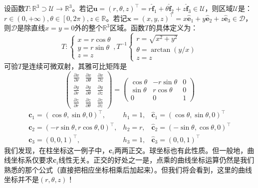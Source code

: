 \documentclass[../main.tex]{subfiles}
\begin{document}
\begin{example}[柱坐标]
    设函数$T:\mathbb{R}^3\supset\mathcal{U}\rightarrow\mathbb{R}^3$。若记$\mathbf{u}=\left(r,\theta,z\right)^\intercal=r\mathbf{\hat{f}}_1+\theta\mathbf{\hat{f}}_2+z\mathbf{\hat{f}}_3\in\mathcal{U}$，则区域$\mathcal{U}$是：$r\in\left(0,+\infty\right),\theta\in\left[0,2\pi\right),z\in\mathbb{R}$。若记$\mathbf{x}=\left(x,y,z\right)^\intercal=x\mathbf{\hat{e}}_1+y\mathbf{\hat{e}}_2+z\mathbf{\hat{e}}_3\in\mathcal{D}$，则$\mathcal{D}$是除直线$x=y=0$外的整个$\mathbb{R}^3$区域。函数$T$的具体定义为：
    \begin{equation*}
        T:\left\{\begin{array}{l}
            x=r\cos \theta \\
            y=r\sin \theta \\
            z=z\end{array}\right.,T^{-1}
        \left\{\begin{array}{l}
            r=\sqrt{x^2+y^2}               \\
            \theta=\arctan\left(y/x\right) \\
            z=z\end{array}\right.
    \end{equation*}
    可验$T$是连续可微双射，其雅可比矩阵是
    \[
        \left(\begin{array}{ccc}
                \frac{\partial x}{\partial r} & \frac{\partial x}{\partial \theta} & \frac{\partial x}{\partial z} \\
                \frac{\partial y}{\partial r} & \frac{\partial y}{\partial \theta} & \frac{\partial y}{\partial z} \\
                \frac{\partial z}{\partial r} & \frac{\partial z}{\partial\theta}  & \frac{\partial z}{\partial z}
            \end{array}\right)=\left(\begin{array}{ccc}
                \cos\theta & -r\sin\theta & 0 \\
                \sin\theta & r\cos\theta  & 0 \\
                0          & 0            & 1\end{array}\right)
    \]
    \begin{equation*}
        \begin{array}{lll}
            \mathbf{c}_1=\left(\cos\theta,\sin\theta,0\right)^\intercal,    & h_1=1, & \mathbf{\hat{c}}_1=\left(\cos\theta,\sin\theta,0\right)^\intercal  \\
            \mathbf{c}_2=\left(-r\sin\theta,r\cos\theta,0\right)^\intercal, & h_2=r, & \mathbf{\hat{c}}_2=\left(-\sin\theta,\cos\theta,0\right)^\intercal \\
            \mathbf{c}_3=\left(0,0,1\right)^\intercal,                      & h_3=1, & \mathbf{\hat{c}}_3=\left(0,0,1\right)^\intercal
        \end{array}\end{equation*}
    我们发现，在柱坐标这一例子中，$\mathbf{c}_i$两两正交。球坐标也有此性质。但一般地，曲线坐标系仅要求$\mathbf{c}_i$线性无关。正交的好处之一是，点乘的曲线坐标运算仍然是我们熟悉的那个公式（直接把相应坐标相乘后加起来）。但我们将会看到，这里的曲线坐标并不是$\left(r,\theta,z\right)$！


\end{example}
\end{document}
